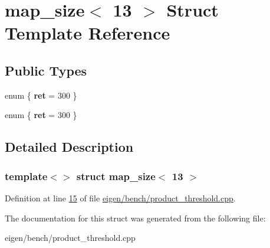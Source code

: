 \hypertarget{structmap__size_3_0113_01_4}{}\section{map\+\_\+size$<$ 13 $>$ Struct Template Reference}
\label{structmap__size_3_0113_01_4}
\subsection*{Public Types}
\begin{DoxyCompactItemize}
\item 
\mbox{\label{structmap__size_3_0113_01_4_aad8cad4d4c6aff7735e9879574a51c34}} 
enum \{ {\bfseries ret} = 300
 \}
\item 
\mbox{\label{structmap__size_3_0113_01_4_a0dbb7181e827194eaaa8d6d4aedfd907}} 
enum \{ {\bfseries ret} = 300
 \}
\end{DoxyCompactItemize}


\subsection{Detailed Description}
\subsubsection*{template$<$$>$\newline
struct map\+\_\+size$<$ 13 $>$}



Definition at line \hyperlink{eigen_2bench_2product__threshold_8cpp_source_l00015}{15} of file \hyperlink{eigen_2bench_2product__threshold_8cpp_source}{eigen/bench/product\+\_\+threshold.\+cpp}.



The documentation for this struct was generated from the following file\+:\begin{DoxyCompactItemize}
\item 
eigen/bench/product\+\_\+threshold.\+cpp\end{DoxyCompactItemize}
